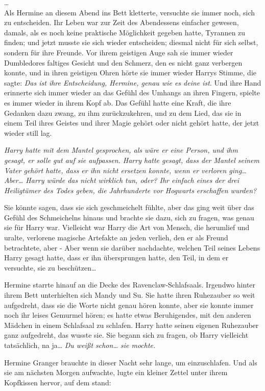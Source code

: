 {…\\ Als Hermine an diesem Abend ins Bett kletterte, versuchte sie immer noch, sich zu entscheiden. Ihr Leben war zur Zeit des Abendessens einfacher gewesen, damals, als es noch keine praktische Möglichkeit gegeben hatte, Tyrannen zu finden; und jetzt musste sie sich wieder entscheiden; diesmal nicht für sich selbst, sondern für ihre Freunde. Vor ihrem geistigen Auge sah sie immer wieder Dumbledores faltiges Gesicht und den Schmerz, den es nicht ganz verbergen konnte, und in ihren geistigen Ohren hörte sie immer wieder Harrys Stimme, die sagte: \emph{Das ist ihre Entscheidung, Hermine, genau wie es deine ist}. Und ihre Hand erinnerte sich immer wieder an das Gefühl des Umhangs an ihren Fingern, spielte es immer wieder in ihrem Kopf ab. Das Gefühl hatte eine Kraft, die ihre Gedanken dazu zwang, zu ihm zurückzukehren, und zu dem Lied, das sie in einem Teil ihres Geistes und ihrer Magie gehört oder nicht gehört hatte, der jetzt wieder still lag.

\emph{Harry hatte mit dem Mantel gesprochen, als wäre er eine Person, und ihm gesagt, er solle gut auf sie aufpassen. Harry hatte gesagt, dass der Mantel seinem Vater gehört hatte, dass er ihn nicht ersetzen konnte, wenn er verloren ging… Aber… Harry würde das nicht wirklich tun, oder? Ihr einfach eines der drei Heiligtümer des Todes geben, die Jahrhunderte vor Hogwarts erschaffen wurden?}

Sie könnte sagen, dass sie sich geschmeichelt fühlte, aber das ging weit über das Gefühl des Schmeichelns hinaus und brachte sie dazu, sich zu fragen, was genau sie für Harry war. Vielleicht war Harry die Art von Mensch, die herumlief und uralte, verlorene magische Artefakte an jeden verlieh, den er als Freund betrachtete, aber - Aber wenn sie darüber nachdachte, welchen Teil seines Lebens Harry gesagt hatte, dass er ihn übersprungen hatte, den Teil, in dem er versuchte, sie zu beschützen…

Hermine starrte hinauf an die Decke des Ravenclaw-Schlafsaals. Irgendwo hinter ihrem Bett unterhielten sich Mandy und Su. Sie hatte ihren Ruhezauber so weit aufgedreht, dass sie die Worte nicht genau hören konnte, aber sie konnte immer noch ihr leises Gemurmel hören; es hatte etwas Beruhigendes, mit den anderen Mädchen in einem Schlafsaal zu schlafen. Harry hatte seinen eigenen Ruhezauber ganz aufgedreht, das wusste sie. Sie begann sich zu fragen, ob Harry vielleicht tatsächlich, na ja… \emph{Du weißt schon… sie mochte.}

Hermine Granger brauchte in dieser Nacht sehr lange, um einzuschlafen. Und als sie am nächsten Morgen aufwachte, lugte ein kleiner Zettel unter ihrem Kopfkissen hervor, auf dem stand:

}
